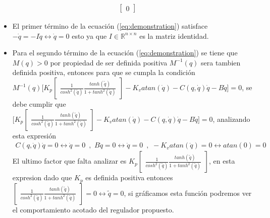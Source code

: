 \documentclass[12pt]{article}
\begin{document}
\begin{enumerate}
\begin{equation}
\begin{split}
\begin{bmatrix}
                0
            \end{bmatrix}
        \end{split}
        \label{eq:demonstration}
    \end{equation}
    \begin{itemize}
        \item El primer término de la ecuación (\ref{eq:demonstration}) satisface $-\dot{q}=-I\dot{q}\leftrightarrow \dot{q}=0$ esto ya que $I \in \mathbb{R}^{n\times n}$ es la matriz identidad.
        \item Para el segundo término de la ecuación (\ref{eq:demonstration}) se tiene que $M(q)>0$
        por propiedad de ser definida positiva $M^{-1}(q)$ sera tambien definida positiva, entonces para que se cumpla la condición $M^{-1}(q)\lbrack K_p
        \begin{bmatrix}
            \frac{1}{cosh^2(\tilde{q})}\frac{tanh(\tilde{q})}{1+tanh^2(\tilde{q})}
        \end{bmatrix}
        -K_vatan(\dot{q})-C(q,\dot{q})\dot{q}-B\dot{q}\rbrack=0$, se debe cumplir que $\lbrack K_p
        \begin{bmatrix}
            \frac{1}{cosh^2(\tilde{q})}\frac{tanh(\tilde{q})}{1+tanh^2(\tilde{q})}
        \end{bmatrix}
        -K_vatan(\dot{q})-C(q,\dot{q})\dot{q}-B\dot{q}\rbrack=0$, analizando esta expresión
        \begin{equation}
            \begin{split}
                C(q,\dot{q})\dot{q}=0\leftrightarrow\dot{q}=0\enspace \text{,}\enspace 
                B\dot{q}=0\leftrightarrow\dot{q}=0\enspace \text{,}\enspace -K_vatan(\dot{q})=0\leftrightarrow atan(0)=0
            \end{split}
            \label{eq:conditions}
        \end{equation}
        El ultimo factor que falta analizar es $K_p
        \begin{bmatrix}
            \frac{1}{cosh^2(\tilde{q})}\frac{tanh(\tilde{q})}{1+tanh^2(\tilde{q})}
        \end{bmatrix}$, en esta expresion dado que $K_p$ es definida positiva entonces $\begin{bmatrix}
            \frac{1}{cosh^2(\tilde{q})}\frac{tanh(\tilde{q})}{1+tanh^2(\tilde{q})}
        \end{bmatrix}=0\leftrightarrow\tilde{q}=0$, si gráficamos esta función podremos ver el comportamiento acotado del regulador propuesto.


\end{itemize}
\end{enumerate}
\end{document}
